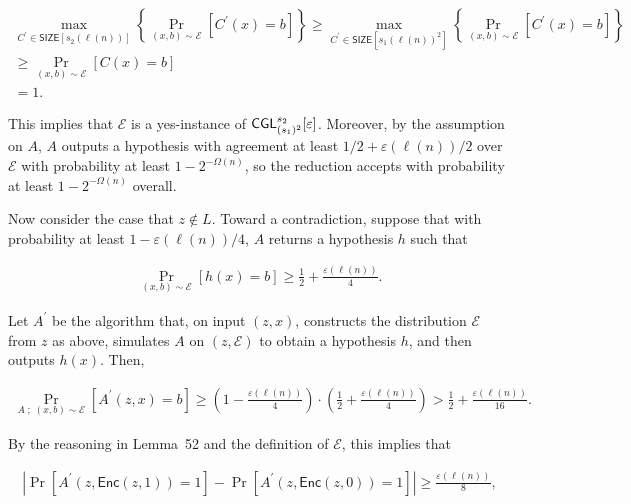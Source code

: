 \documentclass[10pt,a4paper]{article}
\begin{document}
\[\begin{gathered}
\displaystyle\max_{C^{\prime}\in{\mathsf{SIZE}}[s_{2}(\ell(n))]}\left\{\Pr_{(x,b)\sim\mathcal{E}}[C^{\prime}(x)=b]\right\} \displaystyle\geq\max_{C^{\prime}\in{\mathsf{SIZE}}[s_{1}(\ell(n))^{2}]}\left\{\Pr_{(x,b)\sim\mathcal{E}}[C^{\prime}(x)=b]\right\} \\
\displaystyle\geq\Pr_{(x,b)\sim\mathcal{E}}[C(x)=b] \\
\displaystyle=1.
\end{gathered}\]


This implies that $\mathcal{E}$ is a yes-instance of ${\sf CGL}_{(s_{1})^{2}}^{s_{2}}[\varepsilon]$. Moreover, by the assumption on $A$, $A$ outputs a hypothesis with agreement at least $1/2+\varepsilon(\ell(n))/2$ over $\mathcal{E}$ with probability at least $1-2^{-\Omega(n)}$, so the reduction accepts with probability at least $1-2^{-\Omega(n)}$ overall.\par




Now consider the case that $z\notin L$. Toward a contradiction, suppose that with probability at least $1-\varepsilon(\ell(n))/4$, $A$ returns a hypothesis $h$ such that\par


\[\begin{gathered}
\Pr_{(x,b)\sim\mathcal{E}}[h(x)=b]\geq\frac{1}{2}+\frac{\varepsilon(\ell(n))}{4}.
\end{gathered}\]


Let $A^{\prime}$ be the algorithm that, on input $(z,x)$, constructs the distribution $\mathcal{E}$ from $z$ as above, simulates $A$ on $(z,\mathcal{E})$ to obtain a hypothesis $h$, and then outputs $h(x)$. Then,\par


\[\begin{gathered}
\Pr_{A\;;\;(x,b)\sim\mathcal{E}}[A^{\prime}(z,x)=b]\geq\left(1-\frac{\varepsilon(\ell(n))}{4}\right)\cdot\left(\frac{1}{2}+\frac{\varepsilon(\ell(n))}{4}\right)>\frac{1}{2}+\frac{\varepsilon(\ell(n))}{16}.
\end{gathered}\]


By the reasoning in Lemma 52 and the definition of $\mathcal{E}$, this implies that\par


\[\begin{gathered}
\left|\Pr[A^{\prime}(z,{\mathsf{Enc}}(z,1))=1]-\Pr[A^{\prime}(z,{\mathsf{Enc}}(z,0))=1]\right|\geq\frac{\varepsilon(\ell(n))}{8},
\end{gathered}\]
\end{document}

